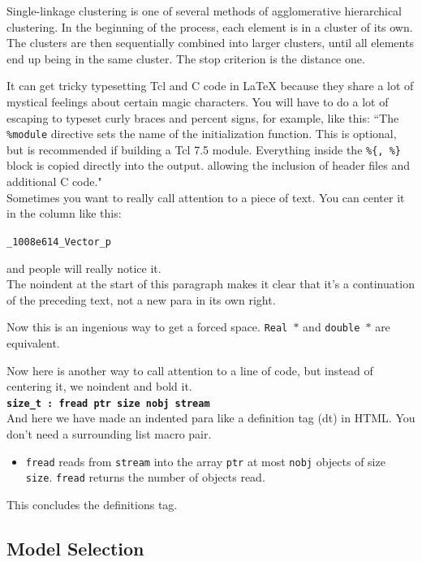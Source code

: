 Single-linkage clustering is one of several methods of agglomerative
hierarchical clustering. In the beginning of the process, each element is in a
cluster of its own. The clusters are then sequentially combined into larger
clusters, until all elements end up being in the same cluster. The stop
criterion is the distance one.




It can get tricky typesetting Tcl and C code in LaTeX because they share
a lot of mystical feelings about certain magic characters.  You
will have to do a lot of escaping to typeset curly braces and percent
signs, for example, like this:
``The {\tt \%module} directive
sets the name of the initialization function.  This is optional, but is
recommended if building a Tcl 7.5 module.
Everything inside the {\tt \%\{, \%\}}
block is copied directly into the output. allowing the inclusion of
header files and additional C code." \\

Sometimes you want to really call attention to a piece of text.  You
can center it in the column like this:
\begin{center}
  {\tt \_1008e614\_Vector\_p}
\end{center}
and people will really notice it.\\

\noindent
The noindent at the start of this paragraph makes it clear that it's
a continuation of the preceding text, not a new para in its own right.


Now this is an ingenious way to get a forced space.
{\tt Real~$*$} and {\tt double~$*$} are equivalent. 

Now here is another way to call attention to a line of code, but instead
of centering it, we noindent and bold it.\\

\noindent
{\bf \tt size\_t : fread ptr size nobj stream } \\

And here we have made an indented para like a definition tag (dt)
in HTML.  You don't need a surrounding list macro pair.
\begin{itemize}
  \item[]  {\tt fread} reads from {\tt stream} into the array {\tt ptr} at
    most {\tt nobj} objects of size {\tt size}.   {\tt fread} returns
    the number of objects read. 
\end{itemize}
This concludes the definitions tag.

\subsection{Model Selection}


